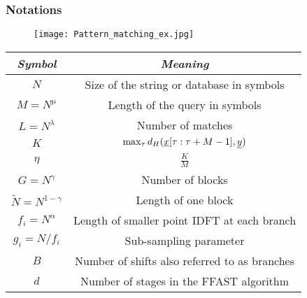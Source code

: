 \begin{frame}\frametitle{Notations}

	\begin{figure}[t]
		\centering
		\texttt{[image: Pattern\_matching\_ex.jpg]}
	\end{figure}
	\vspace{-8pt}
	{\small
	\begin{table}[h!]
		\label{Table:Notations}
		\begin{center}
			\begin{tabular}{|c|c|} 	
				\hline		
				\textit{Symbol}		&  \textit{Meaning} \\		
				\hline
				$N$           		& Size of the string or database in symbols \\
				\hline
				$M = N^{\mu}$       & Length of the query in symbols \\
				\hline
				$L = N^\lambda$    &   Number of matches \\
				\hline
				$K$             &$\max_{\tau}d_{H}(\underline{x}[\tau:\tau+M-1],\underline{y})$\\
				\hline
				$\eta$             &$\frac{K}{M}$\\
				\hline
				$G = N^\gamma$    & Number of blocks \\
				\hline
				$\tilde{N} = N^{1-\gamma}$   & Length of one block \\
				\hline
				$f_i = N^\alpha$     & Length of smaller point IDFT at each branch\\
				\hline
				$g_i = N/f_i$     	   &  Sub-sampling parameter \\
				\hline
				$B$   					    & Number of shifts also referred to as branches  \\
				\hline
				$d$           				& Number of stages in the FFAST algorithm \\
				\hline
			\end{tabular}
		\end{center}
	\end{table}
}
	\end{frame}	 
	 
